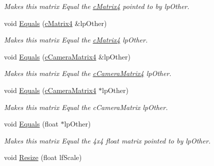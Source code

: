 \begin{DoxyCompactItemize}
\begin{DoxyCompactList}\small\item\em Makes this matrix Equal the \hyperlink{classc_matrix4}{cMatrix4} pointed to by lpOther. \end{DoxyCompactList}\item 
\hypertarget{classc_matrix4_a2b04c467006fe476d6f2e5efc61b3ead}{
void \hyperlink{classc_matrix4_a2b04c467006fe476d6f2e5efc61b3ead}{Equals} (\hyperlink{classc_matrix4}{cMatrix4} \&lpOther)}
\label{classc_matrix4_a2b04c467006fe476d6f2e5efc61b3ead}

\begin{DoxyCompactList}\small\item\em Makes this matrix Equal the \hyperlink{classc_matrix4}{cMatrix4} lpOther. \end{DoxyCompactList}\item 
\hypertarget{classc_matrix4_a0af5e0b1dbbe6d7f4c512a5f07f1e273}{
void \hyperlink{classc_matrix4_a0af5e0b1dbbe6d7f4c512a5f07f1e273}{Equals} (\hyperlink{classc_camera_matrix4}{cCameraMatrix4} \&lpOther)}
\label{classc_matrix4_a0af5e0b1dbbe6d7f4c512a5f07f1e273}

\begin{DoxyCompactList}\small\item\em Makes this matrix Equal the \hyperlink{classc_camera_matrix4}{cCameraMatrix4} lpOther. \end{DoxyCompactList}\item 
\hypertarget{classc_matrix4_a12b028ad76a776c5a01d695ea620962b}{
void \hyperlink{classc_matrix4_a12b028ad76a776c5a01d695ea620962b}{Equals} (\hyperlink{classc_camera_matrix4}{cCameraMatrix4} $\ast$lpOther)}
\label{classc_matrix4_a12b028ad76a776c5a01d695ea620962b}

\begin{DoxyCompactList}\small\item\em Makes this matrix Equal the cCameraMatrix lpOther. \end{DoxyCompactList}\item 
\hypertarget{classc_matrix4_adb76264fa82ef10ebb24b64d6293bc9d}{
void \hyperlink{classc_matrix4_adb76264fa82ef10ebb24b64d6293bc9d}{Equals} (float $\ast$lpOther)}
\label{classc_matrix4_adb76264fa82ef10ebb24b64d6293bc9d}

\begin{DoxyCompactList}\small\item\em Makes this matrix Equal the 4x4 float matrix pointed to by lpOther. \end{DoxyCompactList}\item 
\hypertarget{classc_matrix4_a4785b8464f65d9784db634f3a6f34e52}{
void \hyperlink{classc_matrix4_a4785b8464f65d9784db634f3a6f34e52}{Resize} (float lfScale)}
\label{classc_matrix4_a4785b8464f65d9784db634f3a6f34e52}


\end{DoxyCompactItemize}
